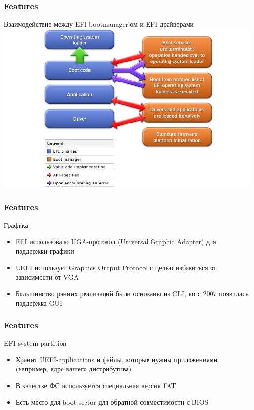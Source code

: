 \documentclass{beamer}
\begin{document}
\begin{frame}\frametitle{Features}
Взаимодействие между EFI-bootmanager'ом и EFI-драйверами
\includegraphics[width=\textwidth,height=\textheight,keepaspectratio]{pics/Efi_flowchart_extended.jpg}
\end{frame}

\begin{frame}\frametitle{Features}
Графика
\begin{itemize}
    \item EFI использовало UGA-протокол (Universal Graphic Adapter) для поддержки графики
    \item UEFI использует Graphics Output Protocol с целью избавиться от зависимости от VGA
    \item Большинство ранних реализаций были основаны на CLI, но с 2007 появилась поддержка GUI
\end{itemize}
\end{frame}

\begin{frame}\frametitle{Features}
EFI system partition
\begin{itemize}
    \item Хранит UEFI-applications и файлы, которые нужны приложениями (например, ядро вашего дистрибутива)
    \item В качестве ФС используется специальная версия FAT
    \item Есть место для boot-sector для обратной совместимости с BIOS
\end{itemize}
\end{frame}
\end{document}
